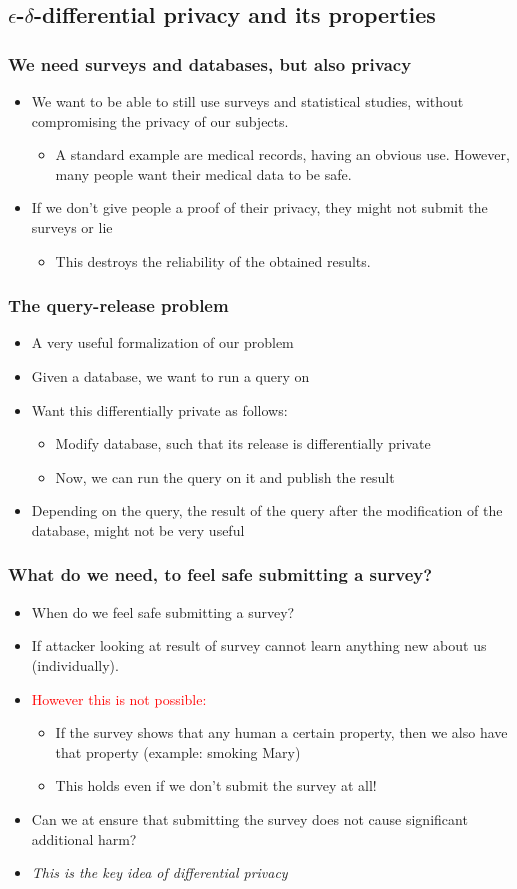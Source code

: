 \documentclass[xcolor=dvipsnames]{beamer}
\newcommand{\itm}{\pause\item}
\begin{document}
    \subsection{$\epsilon$-$\delta$-differential privacy and its properties}
      \begin{frame} %
      	\frametitle{We need surveys and databases, but also privacy}
      	\begin{itemize}
      	  \itm We want to be able to still use surveys and statistical studies, without compromising the privacy of our subjects. 
      	    \begin{itemize}
      		  \itm[$\hookrightarrow$] A standard example are medical records, having an obvious use. However, many people want their medical data to be safe.
      		\end{itemize}
      		\itm If we don't give people a proof of their privacy, they might not submit the surveys or lie
      		\begin{itemize}
      		  \itm[$\hookrightarrow$] This destroys the reliability of the obtained results.
      		\end{itemize}
      	\end{itemize}
      \end{frame}
      \begin{frame} %
      	\frametitle{The query-release problem}
      	\begin{itemize}
      	  \itm A very useful formalization of our problem
      	  \itm Given a database, we want to run a query on
      	  \itm Want this differentially private as follows:
      	  \begin{itemize}
      	  	\itm Modify database, such that its release is differentially private
      	  	\itm Now, we can run the query on it and publish the result
      	  \end{itemize}
      	  \itm[\textbf{Caveat:}] Depending on the query, the result of the query after the modification of the database, might not be very useful
      	\end{itemize}
      \end{frame}
      \begin{frame} %
      	\frametitle{What do we need, to feel safe submitting a survey?}
      	\begin{itemize}
      	  \itm When do we feel safe submitting a survey?
      	  \itm If attacker looking at result of survey cannot learn anything new about us (individually).
      	  \itm \textcolor{red}{However this is not possible:}
      	  \begin{itemize}
      	  	\itm[$\hookrightarrow$] If the survey shows that any human a certain property, then we also have that property (example: smoking Mary)
      	  	\itm This holds even if we don't submit the survey at all!
      	  \end{itemize}
      	  \itm[$\hookrightarrow$] Can we at ensure that submitting the survey does not cause significant additional harm?
      	  \itm \emph{This is the key idea of differential privacy}
      	\end{itemize}
      \end{frame}
\end{document}
